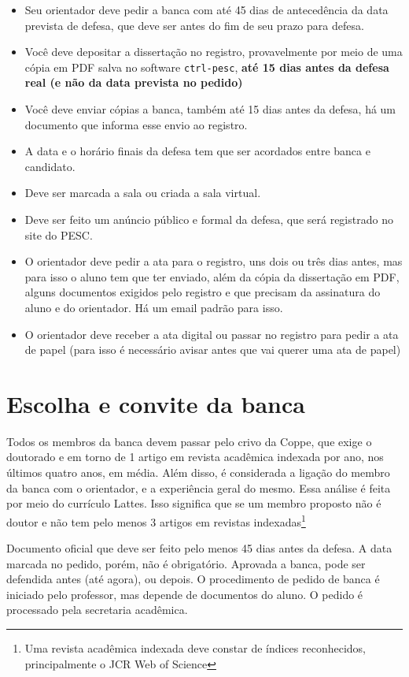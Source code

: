 \begin{itemize}
    \item Seu orientador deve pedir a banca com até 45 dias de antecedência da data prevista de defesa, que deve ser antes do fim de seu prazo para defesa. 
    \item Você deve depositar a dissertação no registro, provavelmente por meio de uma cópia em PDF salva no software \verb|ctrl-pesc|, \textbf{até 15 dias antes da defesa real (e não da data prevista no pedido)}
    \item Você deve enviar cópias a banca, também até 15 dias antes da defesa, há um documento que informa esse envio ao registro.
    \item A data e o horário finais da defesa tem que ser acordados entre banca e candidato.
    \item Deve ser marcada a sala ou criada a sala virtual.
    \item Deve ser feito um anúncio público e formal da defesa, que será registrado no site do PESC.
    \item O orientador deve pedir a ata para o registro, uns dois ou três dias antes, mas para isso o aluno tem que ter enviado, além da cópia da dissertação em PDF, alguns documentos exigidos pelo registro e que precisam da assinatura do aluno e do orientador. Há um email padrão para isso.
    \item O orientador deve receber a ata digital ou passar no registro para pedir a ata de papel (para isso é necessário avisar antes que vai querer uma ata de papel)
\end{itemize}


\section{Escolha e convite da banca}

Todos os membros da banca devem passar pelo crivo da Coppe, que exige o doutorado e em torno de 1 artigo em revista acadêmica indexada por ano, nos últimos quatro anos, em média. Além disso, é considerada a ligação do membro da banca com o orientador, e a experiência geral do mesmo. Essa análise é feita por meio do currículo Lattes. Isso significa que se um membro proposto não é doutor e não tem pelo menos 3 artigos em revistas indexadas\footnote{Uma revista acadêmica indexada deve constar de índices reconhecidos, principalmente o JCR Web of Science}

Documento oficial que deve ser feito pelo menos 45 dias antes da defesa. A data marcada no pedido, porém, não é obrigatório. Aprovada a banca, pode ser defendida antes (até agora), ou depois. O procedimento de pedido de banca é iniciado pelo professor, mas depende de documentos do aluno. O pedido é processado pela secretaria acadêmica.


